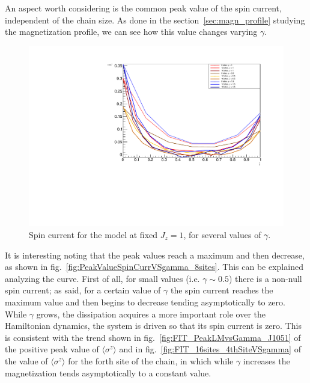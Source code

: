 An aspect worth considering is the common peak value of the spin current, independent of the chain size. As done in the section~\ref{sec:magn_profile} studying the magnetization profile, we can see how this value changes varying $\gamma$. 

\begin{figure}[H]
    \centering
    \includegraphics[scale=0.7]{Figures/SpinCurrcomparisonVSsizeANDdissipationRate.pdf}
    \caption{Spin current for the model at fixed $J_z = 1$, for several values of $\gamma$.}
    \label{fig:SpinCurrcomparisonVSsizeANDdissipationRate}
\end{figure}

It is interesting noting that the peak values reach a maximum and then decrease, as shown in fig.~\ref{fig:PeakValueSpinCurrVSgamma_8sites}. This can be explained analyzing the curve. First of all, for small values (i.e. $\gamma \sim 0.5$) there is a non-null spin current; as said, for a certain value of $\gamma$ the spin current reaches the maximum value and then begins to decrease tending asymptotically to zero. While $\gamma$ grows, the dissipation acquires a more important role over the Hamiltonian dynamics, the system is driven so that its spin current is zero. This is consistent with the trend shown in fig.~\ref{fig:FIT_PeakLMvsGamma_J1051} of the positive peak value of $\langle \sigma^z \rangle$ and in fig.~\ref{fig:FIT_16sites_4thSiteVSgamma} of the value of $\langle \sigma^z \rangle$ for the forth site of the chain, in which while $\gamma$ increases the magnetization tends asymptotically to a constant value. 

